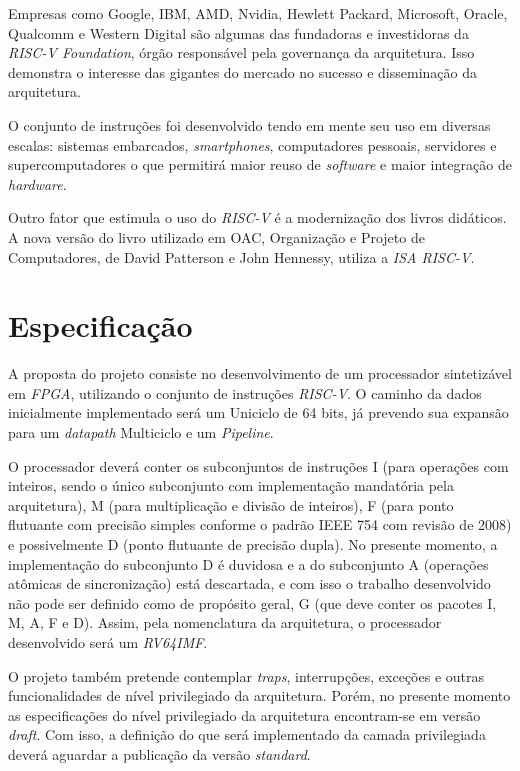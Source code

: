 \documentclass{article}
\begin{document}
    {Empresas como Google, IBM, AMD, Nvidia, Hewlett Packard, Microsoft, Oracle, Qualcomm e Western Digital são algumas das fundadoras e investidoras da \textit{RISC-V Foundation}, órgão responsável pela governança da arquitetura. Isso demonstra o interesse das gigantes do mercado no sucesso e disseminação da arquitetura.}

    {O conjunto de instruções foi desenvolvido tendo em mente seu uso em diversas escalas: sistemas embarcados, \textit{smartphones}, computadores pessoais, servidores e supercomputadores o que permitirá maior reuso de \textit{software} e maior integração de \textit{hardware}.}

    {Outro fator que estimula o uso do \textit{RISC-V} é a modernização dos livros didáticos. A nova versão do livro utilizado em OAC, Organização e Projeto de Computadores, de David Patterson e John Hennessy, utiliza a \textit{ISA RISC-V}.}


\section{Especificação}

    {A proposta do projeto consiste no desenvolvimento de um processador sintetizável em \textit{FPGA}, utilizando o conjunto de instruções \textit{RISC-V}. O caminho da dados inicialmente implementado será um Uniciclo de 64 bits, já prevendo sua expansão para um \textit{datapath} Multiciclo e um \textit{Pipeline}.}

    {O processador deverá conter os subconjuntos de instruções I (para operações com inteiros, sendo o único subconjunto com implementação mandatória pela arquitetura), M (para multiplicação e divisão de inteiros), F (para ponto flutuante com precisão simples conforme o padrão IEEE 754 com revisão de 2008) e possivelmente D (ponto flutuante de precisão dupla). No presente momento, a implementação do subconjunto D é duvidosa e a do subconjunto A (operações atômicas de sincronização) está descartada, e com isso o trabalho desenvolvido não pode ser definido como de propósito geral, G (que deve conter os pacotes I, M, A, F e D). Assim, pela nomenclatura da arquitetura, o processador desenvolvido será um \textit{RV64IMF}.}

    {O projeto também pretende contemplar \textit{traps}, interrupções, exceções e outras funcionalidades de nível privilegiado da arquitetura. Porém, no presente momento as especificações do nível privilegiado da arquitetura encontram-se em versão \textit{draft}. Com isso, a definição do que será implementado da camada privilegiada deverá aguardar a publicação da versão \textit{standard}.}
\end{document}
